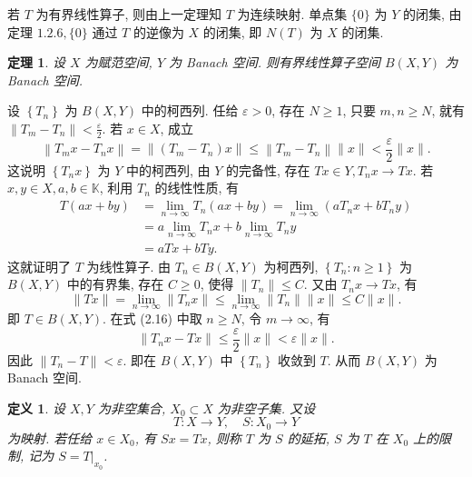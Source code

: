 \documentclass[openany]{ctexbook}
\makeatletter
\theoremstyle{kaiti}
\newtheorem{definition}{定义}[section]
\newtheorem{theorem}{定理}[section]
\theoremstyle{normal}
\renewenvironment{proof}[1][\proofname]{\par
    \pushQED{\qed}%
    \normalfont \topsep6\p@\@plus6\p@\relax
    \trivlist
    \item\relax
    {\heiti #1}\hspace{2\labelsep}\ignorespaces
  }{%
    \popQED\endtrivlist\@endpefalse
  }
\makeatother
\begin{document}
\begin{proof}
若 $T$ 为有界线性算子, 则由上一定理知 $T$ 为连续映射. 单点集 $\{0\}$ 为 $Y$ 的闭集, 由定理 $1.2.6,\{0\}$ 通过 $T$ 的逆像为 $X$ 的闭集, 即 $N(T)$ 为 $X$ 的闭集.
\end{proof}

\begin{theorem}
  设 $X$ 为赋范空间, $Y$ 为 Banach 空间. 则有界线性算子空间 $B(X, Y)$ 为 Banach 空间.
\end{theorem}

\begin{proof}
设 $\left\{T_n\right\}$ 为 $B(X, Y)$ 中的柯西列. 任给 $\varepsilon>0$, 存在 $N \geqslant 1$, 只要 $m, n \geqslant N$, 就有 $\left\|T_m-T_n\right\|<\frac{\varepsilon}{2}$. 若 $x \in X$, 成立
\begin{equation}
  \left\|T_m x-T_n x\right\|=\left\|\left(T_m-T_n\right) x\right\| \leqslant\left\|T_m-T_n\right\|\|x\|<\frac{\varepsilon}{2}\|x\|.
\end{equation}
这说明 $\left\{T_n x\right\}$ 为 $Y$ 中的柯西列, 由 $Y$ 的完备性, 存在 $T x \in Y, T_n x \rightarrow T x$.
若 $x, y \in X, a, b \in \mathbb{K}$, 利用 $T_n$ 的线性性质, 有
$$
\begin{aligned}
T(a x+b y) &=\lim_{n \rightarrow \infty} T_n(a x+b y)=\lim_{n \rightarrow \infty}\left(a T_n x+b T_n y\right) \\
&=a \lim_{n \rightarrow \infty} T_n x+b \lim_{n \rightarrow \infty} T_n y \\
&=a T x+b T y.
\end{aligned}
$$
这就证明了 $T$ 为线性算子. 由 $T_n \in B(X, Y)$ 为柯西列, $\left\{T_n: n \geqslant 1\right\}$ 为 $B(X, Y)$ 中的有界集, 存在 $C \geqslant 0$, 使得 $\left\|T_n\right\| \leqslant C$. 又由 $T_n x \rightarrow T x$, 有
$$
\|T x\|=\lim_{n \rightarrow \infty}\left\|T_n x\right\| \leqslant \lim_{n \rightarrow \infty}\left\|T_n\right\|\|x\| \leqslant C\|x\|.
$$
即 $T \in B(X, Y)$.
在式 (2.16) 中取 $n \geqslant N$, 令 $m \rightarrow \infty$, 有
$$
\left\|T_n x-T x\right\| \leqslant \frac{\varepsilon}{2}\|x\|<\varepsilon\|x\|.
$$
因此 $\left\|T_n-T\right\|<\varepsilon$. 即在 $B(X, Y)$ 中 $\left\{T_n\right\}$ 收敛到 $T$. 从而 $B(X, Y)$ 为 Banach 空间.
\end{proof}

\begin{definition}
设 $X, Y$ 为非空集合, $X_0 \subset X$ 为非空子集. 又设
$$
T: X \rightarrow Y, \quad S: X_0 \rightarrow Y
$$
为映射. 若任给 $x \in X_0$, 有 $S x=T x$, 则称 $T$ 为 $S$ 的延拓, $S$ 为 $T$ 在 $X_0$ 上的限制, 记为 $S=\left.T\right|_{x_0}$.
\end{definition}
\end{document}
